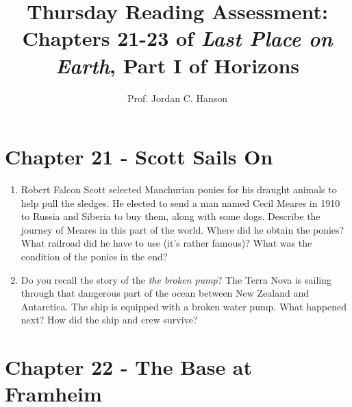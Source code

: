 \documentclass{article}
\begin{document}
\title{Thursday Reading Assessment: Chapters 21-23 of \textit{Last Place on Earth}, Part I of Horizons}
\author{Prof. Jordan C. Hanson}

\maketitle

\section{Chapter 21 - Scott Sails On}

\begin{enumerate}
\item Robert Falcon Scott selected Manchurian ponies for his draught animals to help pull the sledges.  He elected to send a man named Cecil Meares in 1910 to Russia and Siberia to buy them, along with some dogs.  Describe the journey of Meares in this part of the world.  Where did he obtain the ponies?  What railroad did he have to use (it's rather famous)?  What was the condition of the ponies in the end? \\ \vspace{2cm}
\item Do you recall the story of the \textit{the broken pump}?  The Terra Nova is sailing through that dangerous part of the ocean between New Zealand and Antarctica.  The ship is equipped with a broken water pump.  What happened next?  How did the ship and crew survive? \\ \vspace{2cm}
\end{enumerate}

\section{Chapter 22 - The Base at Framheim}
\end{document}
